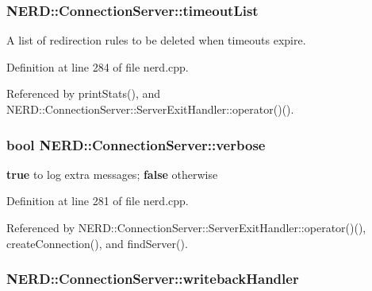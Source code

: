 \hypertarget{classNERD_1_1ConnectionServer_adc22ef94ff5d014433eef07e054e1d69}{
\subsubsection[{timeout\-List}]{ {\bf \-N\-E\-R\-D\-::\-Connection\-Server\-::timeout\-List}}}
\label{classNERD_1_1ConnectionServer_adc22ef94ff5d014433eef07e054e1d69}


\-A list of redirection rules to be deleted when timeouts expire. 



\-Definition at line 284 of file nerd.\-cpp.



\-Referenced by print\-Stats(), and \-N\-E\-R\-D\-::\-Connection\-Server\-::\-Server\-Exit\-Handler\-::operator()().

\hypertarget{classNERD_1_1ConnectionServer_a36f12900d6c2461984a1e093bfc42403}{
\subsubsection[{verbose}]{\setlength{\rightskip}{0pt plus 5cm}bool {\bf \-N\-E\-R\-D\-::\-Connection\-Server\-::verbose}}}
\label{classNERD_1_1ConnectionServer_a36f12900d6c2461984a1e093bfc42403}


{\bfseries true} to log extra messages; {\bfseries false} otherwise 



\-Definition at line 281 of file nerd.\-cpp.



\-Referenced by \-N\-E\-R\-D\-::\-Connection\-Server\-::\-Server\-Exit\-Handler\-::operator()(), create\-Connection(), and find\-Server().

\hypertarget{classNERD_1_1ConnectionServer_a8aa938754f8f34144d205d4dd208d91a}{
\subsubsection[{writeback\-Handler}]{ {\bf \-N\-E\-R\-D\-::\-Connection\-Server\-::writeback\-Handler}}}
\label{classNERD_1_1ConnectionServer_a8aa938754f8f34144d205d4dd208d91a}


